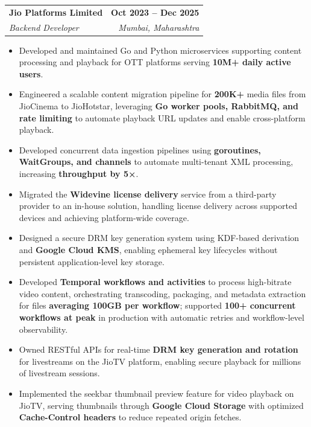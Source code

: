 \documentclass[letterpaper,11pt]{article}
\makeatletter
\newcommand{\resumeItem}[1]{
  \item{
    {#1 \vspace{-2pt}}
  }
}
\newcommand{\resumeSubheading}[4]{
  \vspace{-2pt}\item
    \begin{tabular*}{1.0\textwidth}[t]{l@{\extracolsep{\fill}}r}
      \textbf{#1} & \textbf{\small #2} \\
      \textit{\small#3} & \textit{\small #4} \\
    \end{tabular*}\vspace{-7pt}
}
\newcommand{\resumeItemListStart}{\begin{itemize}}
\newcommand{\resumeItemListEnd}{\end{itemize}\vspace{-5pt}}
\makeatother
\begin{document}
    \resumeSubheading
      {Jio Platforms Limited}{Oct 2023 -- Dec 2025}
      {Backend Developer}{Mumbai, Maharashtra}
      \resumeItemListStart
        \resumeItem{Developed and maintained Go and Python microservices supporting content processing and playback for OTT platforms serving \textbf{10M+ daily active users}.}
        \resumeItem{Engineered a scalable content migration pipeline for \textbf{200K+} media files from JioCinema to JioHotstar, leveraging \textbf{Go worker pools, RabbitMQ, and rate limiting} to automate playback URL updates and  enable cross-platform playback.}
        \resumeItem{Developed concurrent data ingestion pipelines using  \textbf{goroutines, WaitGroups, and channels} to automate multi-tenant XML processing, increasing \textbf{throughput by 5×}.}
        \resumeItem{Migrated the \textbf{Widevine license delivery} service from a third-party provider to an in-house solution, handling license delivery across supported devices and achieving platform-wide coverage.}
        \resumeItem{Designed a secure DRM key generation system using KDF-based derivation and \textbf{Google Cloud KMS}, enabling ephemeral key lifecycles without persistent application-level key storage.}
        \resumeItem{Developed \textbf{Temporal workflows and activities} to process high-bitrate video content, orchestrating transcoding, packaging, and metadata extraction for files \textbf{averaging 100GB per workflow}; supported \textbf{100+ concurrent workflows at peak} in production with automatic retries and workflow-level observability.}
        \resumeItem{Owned RESTful APIs for real-time  \textbf{DRM key generation and rotation} for livestreams on the JioTV platform, enabling secure playback for millions of livestream sessions.}
        \resumeItem{Implemented the seekbar thumbnail preview feature for video playback on JioTV, serving thumbnails through \textbf{Google Cloud Storage} with optimized \textbf{Cache-Control headers} to reduce repeated origin fetches.}
    \resumeItemListEnd
    
\end{document}

